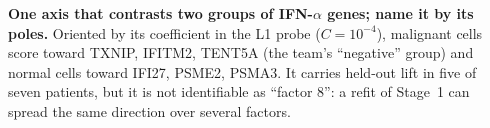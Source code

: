 
\begin{coreanswer}
\textbf{One axis that contrasts two groups of IFN-$\alpha$ genes; name it by its poles.} Oriented by its coefficient in the L1 probe ($C=10^{-4}$), malignant cells score toward TXNIP, IFITM2, TENT5A (the team's ``negative'' group) and normal cells toward IFI27, PSME2, PSMA3. It carries held-out lift in five of seven patients, but it is not identifiable as ``factor 8'': a refit of Stage~1 can spread the same direction over several factors.
\end{coreanswer}

